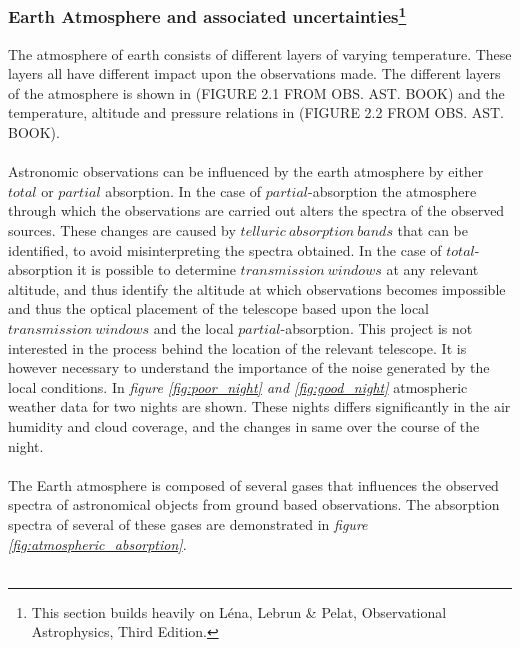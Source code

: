 \documentclass[a4paper, 12pt, twoside]{article}
\begin{document}
\subsubsection[Earth Atmosphere and associated uncertainties]{Earth Atmosphere and associated uncertainties\footnote{This section builds heavily on Léna, Lebrun \& Pelat, Observational Astrophysics, Third Edition.}} \label{athmosphere}
The atmosphere of earth consists of different layers of varying temperature. These layers all have different impact upon the observations made. The different layers of the atmosphere is shown in (FIGURE 2.1 FROM OBS. AST. BOOK) and the temperature, altitude and pressure relations in (FIGURE 2.2 FROM OBS. AST. BOOK).\\
\\
Astronomic observations can be influenced by the earth atmosphere by either $total$ or $partial$ absorption. In the case of $partial$-absorption the atmosphere through which the observations are carried out alters the spectra of the observed sources. These changes are caused by $telluric\ absorption\ bands$ that can be identified, to avoid misinterpreting the spectra obtained. In the case of $total$-absorption it is possible to determine $transmission\ windows$ at any relevant altitude, and thus identify the altitude at which observations becomes impossible and thus the optical placement of the telescope based upon the local $transmission\ windows$ and the local $partial$-absorption. This project is not interested in the process behind the location of the relevant telescope. It is however necessary to understand the importance of the noise generated by the local conditions. In \emph{figure \ref{fig:poor_night} and \ref{fig:good_night}} atmospheric weather data for two nights are shown. These nights differs significantly in the air humidity and cloud coverage, and the changes in same over the course of the night. \\
\\
The Earth atmosphere is composed of several gases that influences the observed spectra of astronomical objects from ground based observations. The absorption spectra of several of these gases are demonstrated in \emph{figure \ref{fig:atmospheric_absorption}}.\\
\\
\end{document}
